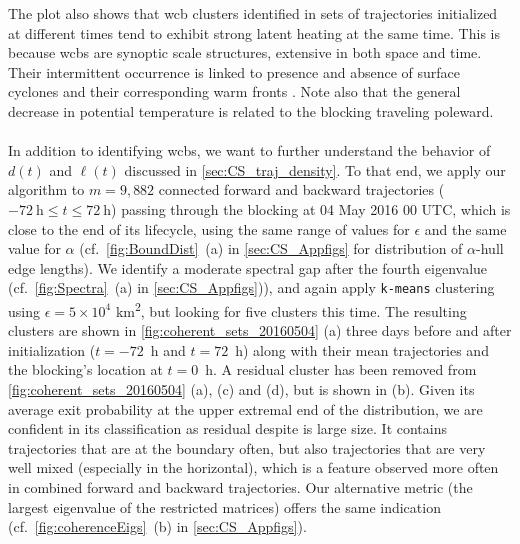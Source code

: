The plot also shows that \gls{wcb} clusters identified in sets of trajectories initialized at different times tend to exhibit strong latent heating at the same time. This is because \glspl{wcb} are synoptic scale structures, extensive in both space and time. Their intermittent occurrence is linked to presence and absence of surface cyclones and their corresponding warm fronts \parencite{madonnaWarmConveyorBelts2014a, cattoGlobalRelationshipFronts2015}. Note also that the general decrease in potential temperature is related to the blocking traveling poleward.\\
\\
In addition to identifying \glspl{wcb}, we want to further understand the behavior of $d(t)$ and $\ell(t)$ discussed in \cref{sec:CS_traj_density}. To that end, we apply our algorithm to $m = 9,882$ connected forward and backward trajectories ($-72~\mathrm{h} \leq t \leq 72~\mathrm{h}$) passing through the blocking at 04 May 2016 00 UTC, which is close to the end of its lifecycle, using the same range of values for $\epsilon$ and the same value for $\alpha$ (cf.~\cref{fig:BoundDist}~(a) in \cref{sec:CS_Appfigs} for distribution of $\alpha$-hull edge lengths). We identify a moderate spectral gap after the fourth eigenvalue (cf.~\cref{fig:Spectra}~(a) in \cref{sec:CS_Appfigs})), and again apply \texttt{k-means} clustering using $\epsilon=5 \times 10^4$ km\textsuperscript{2}, but looking for five clusters this time. The resulting clusters are shown in \cref{fig:coherent_sets_20160504} (a) three days before and after initialization ($t=-72$~h and $t=72$~h) along with their mean trajectories and the blocking's location at $t=0$~h. A residual cluster has been removed from \cref{fig:coherent_sets_20160504} (a), (c) and (d), but is shown in (b). Given its average exit probability at the upper extremal end of the distribution, we are confident in its classification as residual despite is large size. It contains trajectories that are at the boundary often, but also trajectories that are very well mixed (especially in the horizontal), which is a feature observed more often in combined forward and backward trajectories. Our alternative metric (the largest eigenvalue of the restricted matrices) offers the same indication (cf.~\cref{fig:coherenceEigs}~(b) in \cref{sec:CS_Appfigs}).


